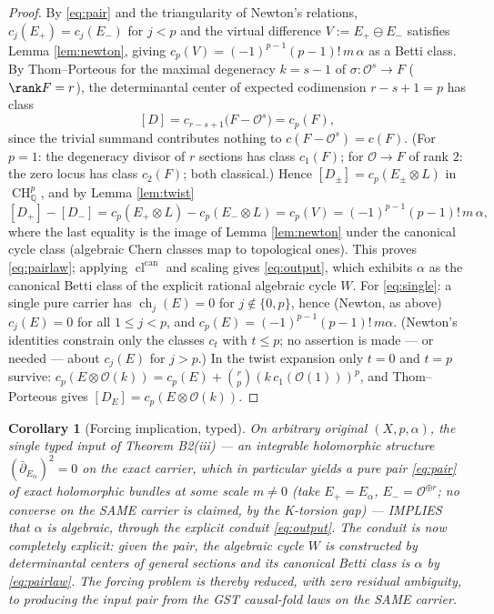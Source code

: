 \documentclass[11pt]{article}
\newtheorem{corollary}[theorem]{Corollary}
\theoremstyle{definition}
\newcommand{\ch}{\operatorname{ch}}
\newcommand{\cl}{\operatorname{cl}^{\operatorname{can}}}
\newcommand{\CH}{\operatorname{CH}}
\newcommand{\ddbar}{\bar\partial}
\newcommand{\tensor}{\otimes}
\newcommand{\Oo}{\mathcal O}
\begin{document}
\begin{proof}
By \eqref{eq:pair} and the triangularity of Newton's relations,
$c_j(E_+)=c_j(E_-)$ for $j<p$ and the virtual difference
$V:=E_+\ominus E_-$ satisfies Lemma \ref{lem:newton}, giving
$c_p(V)=(-1)^{p-1}(p-1)!\,m\,\alpha$ as a Betti class. By
Thom--Porteous for the maximal degeneracy $k=s-1$ of
$\sigma:\Oo^s\to F$ ($\rank F=r$), the determinantal center of
expected codimension $r-s+1=p$ has class
\[
[D]=c_{r-s+1}\bigl(F-\Oo^{s}\bigr)=c_p(F),
\]
since the trivial summand contributes nothing to $c(F-\Oo^s)=c(F)$.
(For $p=1$: the degeneracy divisor of $r$ sections has class
$c_1(F)$; for $\Oo\to F$ of rank $2$: the zero locus has class
$c_2(F)$; both classical.) Hence
$[D_\pm]=c_p(E_\pm\tensor L)$ in $\CH^p_{\mathbb Q}$, and by Lemma
\ref{lem:twist}
\[
[D_+]-[D_-]=c_p(E_+\tensor L)-c_p(E_-\tensor L)
=c_p(V)=(-1)^{p-1}(p-1)!\,m\,\alpha,
\]
where the last equality is the image of Lemma \ref{lem:newton} under
the canonical cycle class (algebraic Chern classes map to topological
ones). This proves \eqref{eq:pairlaw}; applying $\cl$ and scaling
gives \eqref{eq:output}, which exhibits $\alpha$ as the canonical
Betti class of the explicit rational algebraic cycle $W$.
For \eqref{eq:single}: a single pure carrier has
$\ch_j(E)=0$ for $j\notin\{0,p\}$, hence (Newton, as above)
$c_j(E)=0$ for all $1\le j<p$, and
$c_p(E)=(-1)^{p-1}(p-1)!\,m\alpha$. (Newton's identities constrain
only the classes $c_t$ with $t\le p$; no assertion is made --- or
needed --- about $c_j(E)$ for $j>p$.) In the twist expansion only
$t=0$ and $t=p$ survive:
$c_p(E\tensor\Oo(k))=c_p(E)+\binom{r}{p}(k\,c_1(\Oo(1)))^{p}$, and
Thom--Porteous gives $[D_E]=c_p(E\tensor\Oo(k))$.
\end{proof}

\begin{corollary}[Forcing implication, typed]
\label{cor:forcing}
On arbitrary original $(X,p,\alpha)$, the single typed input of
Theorem B2(iii) --- an integrable holomorphic structure
$(\ddbar_{E_\alpha})^2=0$ on the exact carrier, which in particular
yields a pure pair \eqref{eq:pair} of exact holomorphic bundles at
some scale $m\ne0$ (take $E_+=E_\alpha$, $E_-=\Oo^{\oplus r}$; no
converse on the SAME carrier is claimed, by the K-torsion gap) ---
IMPLIES that $\alpha$ is algebraic, through the explicit
conduit \eqref{eq:output}. The conduit is now completely explicit:
given the pair, the algebraic cycle $W$ is constructed by
determinantal centers of general sections and its canonical Betti
class is $\alpha$ by \eqref{eq:pairlaw}. The forcing problem is
thereby reduced, with zero residual ambiguity, to producing the input
pair from the GST causal-fold laws on the SAME carrier.
\end{corollary}
\end{document}
